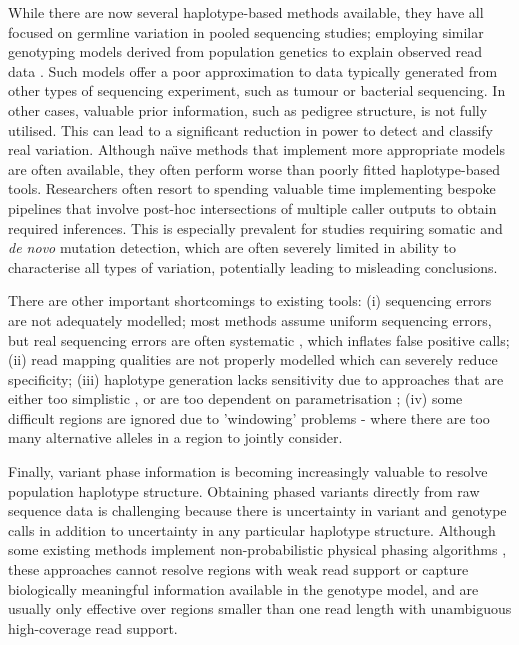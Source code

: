 \documentclass[notitlepage, twocolumn]{article}
\begin{document}
While there are now several haplotype-based methods available, they have all focused on germline variation in pooled sequencing studies; employing similar genotyping models derived from population genetics to explain observed read data \cite{gatk, freebayes, platypus}. Such models offer a poor approximation to data typically generated from other types of sequencing experiment, such as tumour or bacterial sequencing. In other cases, valuable prior information, such as pedigree structure, is not fully utilised. This can lead to a significant reduction in power to detect and classify real variation. Although na\"\i ve methods that implement more appropriate models are often available, they often perform worse than poorly fitted haplotype-based tools. Researchers often resort to spending valuable time implementing bespoke pipelines that involve post-hoc intersections of multiple caller outputs to obtain required inferences. This is especially prevalent for studies requiring somatic and \emph{de novo} mutation detection, which are often severely limited in ability to characterise all types of variation, potentially leading to misleading conclusions.

There are other important shortcomings to existing tools: (i) sequencing errors are not adequately modelled; most methods \cite{freebayes, gatk} assume uniform sequencing errors, but real sequencing errors are often systematic \cite{illumina-error}, which inflates false positive calls; (ii) read mapping qualities \cite{maq} are not properly modelled which can severely reduce specificity; (iii) haplotype generation lacks sensitivity due to approaches that are either too simplistic \cite{freebayes}, or are too dependent on parametrisation \cite{gatk}; (iv) some difficult regions are ignored due to 'windowing' problems - where there are too many alternative alleles in a region to jointly consider.

Finally, variant phase information is becoming increasingly valuable to resolve population haplotype structure. Obtaining phased variants directly from raw sequence data is challenging because there is uncertainty in variant and genotype calls in addition to uncertainty in any particular haplotype structure. Although some existing methods implement non-probabilistic physical phasing algorithms \cite{freebayes}, these approaches cannot resolve regions with weak read support or capture biologically meaningful information available in the genotype model, and are usually only effective over regions smaller than one read length with unambiguous high-coverage read support.
\end{document}
